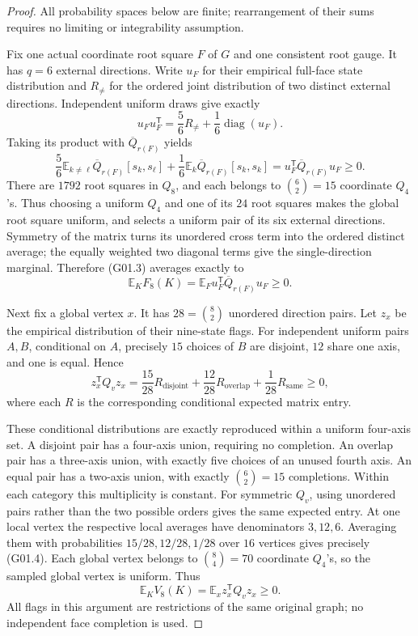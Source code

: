 \documentclass[11pt]{article}
\newcommand{\E}{\mathbb E}
\begin{document}
\begin{proof}
All probability spaces below are finite; rearrangement of their sums
requires no limiting or integrability assumption.

Fix one actual coordinate root square \(F\) of \(G\) and one consistent
root gauge.  It has \(q=6\) external directions.  Write \(u_F\) for their
empirical full-face state distribution and \(R_{\ne}\) for the ordered
joint distribution of two distinct external directions.  Independent
uniform draws give exactly
\[
 u_Fu_F^{\mathsf T}
 =\frac56R_{\ne}+\frac16\operatorname{diag}(u_F).
 \tag{G02.2}
\]
Taking its product with \(\overline Q_{r(F)}\) yields
\[
 \frac56\E_{k\ne\ell}\overline Q_{r(F)}[s_k,s_\ell]
 +\frac16\E_k\overline Q_{r(F)}[s_k,s_k]
 =u_F^{\mathsf T}\overline Q_{r(F)}u_F\ge0.
 \tag{G02.3}
\]
There are \(1792\) root squares in \(Q_8\), and each belongs to
\(\binom62=15\) coordinate \(Q_4\)'s.  Thus choosing a uniform \(Q_4\)
and one of its \(24\) root squares makes the global root square uniform,
and selects a uniform pair of its six external directions.
Symmetry of the matrix turns its unordered cross term into the ordered
distinct average; the equally weighted two diagonal terms give the
single-direction marginal.  Therefore (G01.3) averages exactly to
\[
 \E_KF_8(K)=
 \E_F u_F^{\mathsf T}\overline Q_{r(F)}u_F\ge0.
 \tag{G02.4}
\]

Next fix a global vertex \(x\).  It has \(28=\binom82\) unordered
direction pairs.  Let \(z_x\) be the empirical distribution of their
nine-state flags.  For independent uniform pairs \(A,B\), conditional
on \(A\), precisely \(15\) choices of \(B\) are disjoint, \(12\) share
one axis, and one is equal.  Hence
\[
 z_x^{\mathsf T}Q_vz_x
 =\frac{15}{28}R_{\mathrm{disjoint}}
 +\frac{12}{28}R_{\mathrm{overlap}}
 +\frac1{28}R_{\mathrm{same}}\ge0,
 \tag{G02.5}
\]
where each \(R\) is the corresponding conditional expected matrix entry.

These conditional distributions are exactly reproduced within a
uniform four-axis set.  A disjoint pair has a four-axis union, requiring
no completion.  An overlap pair has a three-axis union, with exactly
five choices of an unused fourth axis.  An equal pair has a two-axis
union, with exactly \(\binom62=15\) completions.  Within each category
this multiplicity is constant.  For symmetric \(Q_v\), using unordered
pairs rather than the two possible orders gives the same expected
entry.  At one local vertex the respective local averages have
denominators \(3,12,6\).  Averaging them with probabilities
\(15/28,12/28,1/28\) over \(16\) vertices gives precisely (G01.4).
Each global vertex belongs to \(\binom84=70\) coordinate \(Q_4\)'s,
so the sampled global vertex is uniform.  Thus
\[
 \E_KV_8(K)=\E_x z_x^{\mathsf T}Q_vz_x\ge0.
 \tag{G02.6}
\]
All flags in this argument are restrictions of the same original graph;
no independent face completion is used.


\end{proof}
\end{document}
